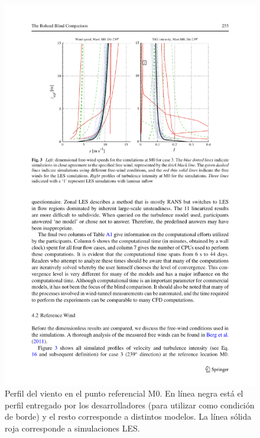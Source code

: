 \begin{figure}[H]
	\centering
	\includegraphics[width=0.85\linewidth,trim={2.7cm 14.3cm 2.0cm 2cm},clip]{bolund1.pdf}%
	\caption{Perfil del viento en el punto referencial M0. En línea negra está el perfil entregado por los desarrolladores (para utilizar como condición de borde) y el resto corresponde a distintos modelos. La línea sólida roja corresponde a simulaciones LES.}
	\label{fig:an1_m0}
\end{figure}

